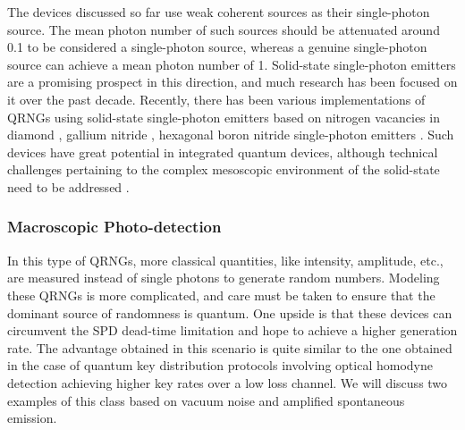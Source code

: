 \documentclass[]{interact}
\theoremstyle{plain}%
\theoremstyle{definition}
\theoremstyle{remark}
\begin{document}
The devices discussed so far use weak coherent sources as their single-photon source. The mean photon number of such sources should be attenuated around 0.1 to be considered a single-photon source, whereas a genuine single-photon source can achieve a mean photon number of 1. Solid-state single-photon emitters are a promising prospect in this direction, and much research has been focused on it over the past decade. Recently, there has been various implementations of QRNGs using solid-state single-photon emitters based on nitrogen vacancies in diamond \cite{chen2019single}, gallium nitride \cite{luo2020quantum}, hexagonal boron
nitride single-photon emitters \cite{white2020quantum}. Such devices have great potential in integrated quantum devices, although technical challenges pertaining to the complex mesoscopic environment of the solid-state need to be addressed \cite{aharonovich2016solid}.

\subsubsection{Macroscopic Photo-detection}
In this type of QRNGs, more classical quantities, like intensity, amplitude, etc., are measured instead of single photons to generate random numbers. Modeling these QRNGs is more complicated, and care must be taken to ensure that the dominant source of randomness is quantum. One upside is that these devices can circumvent the SPD dead-time limitation and hope to achieve a higher generation rate. The advantage obtained in this scenario is quite similar to the one obtained in the case of quantum key distribution protocols involving optical homodyne detection \cite{Grosshans2003} achieving higher key rates over a low loss channel. We will discuss two examples of this class based on vacuum noise and amplified spontaneous emission. 
\end{document}
